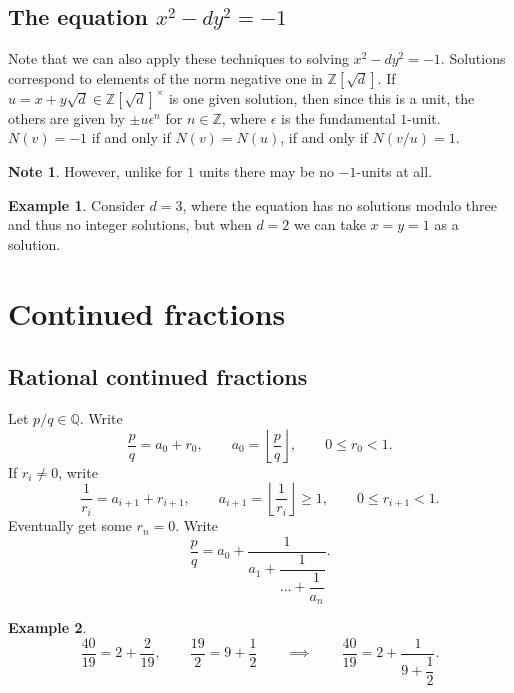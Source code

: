 \documentclass{article}
\newcommand{\Z}{\mathbb{Z}}
\newcommand{\Q}{\mathbb{Q}}
\newcommand{\rb}[1]{\left( #1 \right)}
\renewcommand{\sb}[1]{\left[ #1 \right]}
\newcommand{\fb}[1]{\left\lfloor #1 \right\rfloor}
\theoremstyle{definition}\newtheorem{definition}{Definition}
\theoremstyle{definition}\newtheorem{remark}[definition]{Remark}
\theoremstyle{definition}\newtheorem*{example}{Example}
\theoremstyle{definition}\newtheorem*{note}{Note}
\begin{document}

\subsection{The equation $ x^2 - dy^2 = - 1 $}

Note that we can also apply these techniques to solving $ x^2 - dy^2 = -1 $. Solutions correspond to elements of the norm negative one in $ \Z\sb{\sqrt{d}} $. If $ u = x + y\sqrt{d} \in \Z\sb{\sqrt{d}}^\times $ is one given solution, then since this is a unit, the others are given by $ \pm u\epsilon^n $ for $ n \in \Z $, where $ \epsilon $ is the fundamental $ 1 $-unit. $ N\rb{v} = -1 $ if and only if $ N\rb{v} = N\rb{u} $, if and only if $ N\rb{v / u} = 1 $.

\begin{note}
However, unlike for $ 1 $ units there may be no $ -1 $-units at all.
\end{note}

\begin{example}
Consider $ d = 3 $, where the equation has no solutions modulo three and thus no integer solutions, but when $ d = 2 $ we can take $ x = y = 1 $ as a solution.
\end{example}

\section{Continued fractions}

\subsection{Rational continued fractions}

Let $ p / q \in \Q $. Write
$$ \dfrac{p}{q} = a_0 + r_0, \qquad a_0 = \fb{\dfrac{p}{q}}, \qquad 0 \le r_0 < 1. $$
If $ r_i \ne 0 $, write
$$ \dfrac{1}{r_i} = a_{i + 1} + r_{i + 1}, \qquad a_{i + 1} = \fb{\dfrac{1}{r_i}} \ge 1, \qquad 0 \le r_{i + 1} < 1. $$
Eventually get some $ r_n = 0 $. Write
$$ \dfrac{p}{q} = a_0 + \dfrac{1}{a_1 + \dfrac{1}{\dots + \dfrac{1}{a_n}}}. $$

\begin{example}
$$ \dfrac{40}{19} = 2 + \dfrac{2}{19}, \qquad \dfrac{19}{2} = 9 + \dfrac{1}{2} \qquad \implies \qquad \dfrac{40}{19} = 2 + \dfrac{1}{9 + \dfrac{1}{2}}. $$
\end{example}
\end{document}
